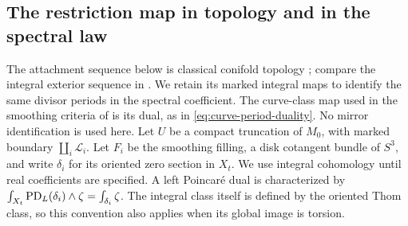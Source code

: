 \subsection{The restriction map in topology and in the spectral law}
The attachment sequence below is classical conifold topology
\cite{rossi,lee-lin-wang}; compare the integral exterior sequence in
\cite[Section~9.7]{wuebben-cy-mirror}. We retain its marked integral maps
to identify the same divisor periods in the spectral coefficient.
The curve-class map used in the smoothing criteria of
\cite{wuebben-cy-obstruction,wuebben-cy-smoothing} is its dual, as in
\eqref{eq:curve-period-duality}. No mirror identification is used here.
Let $U$ be a compact truncation of $M_0$, with marked boundary
$\coprod_i\mathcal L_i$. Let $F_i$ be the smoothing filling, a disk
cotangent bundle of $S^3$, and write $\delta_i$ for its oriented zero
section in $X_t$. We use integral cohomology until real coefficients
are specified. A left Poincar\'e dual is characterized by
$\int_{X_t}\operatorname{PD}_L(\delta_i)\wedge\zeta=\int_{\delta_i}\zeta$.
The integral class itself is defined by the oriented Thom class,
so this convention also applies when its global image is torsion.


